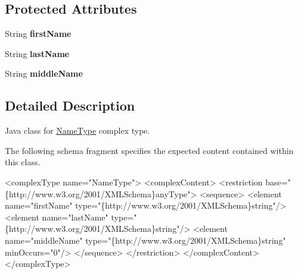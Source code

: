 \subsection*{Protected Attributes}
\begin{DoxyCompactItemize}
\item 
\hypertarget{classcom_1_1telefonica_1_1schemas_1_1unica_1_1rest_1_1directory_1_1v1_1_1NameType_afd5e3e0b03a0ed6c6f1b8b42b3fbea0e}{
String {\bfseries firstName}}
\label{classcom_1_1telefonica_1_1schemas_1_1unica_1_1rest_1_1directory_1_1v1_1_1NameType_afd5e3e0b03a0ed6c6f1b8b42b3fbea0e}

\item 
\hypertarget{classcom_1_1telefonica_1_1schemas_1_1unica_1_1rest_1_1directory_1_1v1_1_1NameType_ad0612c47f322b339ca6ac0a0cedd188e}{
String {\bfseries lastName}}
\label{classcom_1_1telefonica_1_1schemas_1_1unica_1_1rest_1_1directory_1_1v1_1_1NameType_ad0612c47f322b339ca6ac0a0cedd188e}

\item 
\hypertarget{classcom_1_1telefonica_1_1schemas_1_1unica_1_1rest_1_1directory_1_1v1_1_1NameType_adfcca6ac63ae4326a3a844a6cc0724d8}{
String {\bfseries middleName}}
\label{classcom_1_1telefonica_1_1schemas_1_1unica_1_1rest_1_1directory_1_1v1_1_1NameType_adfcca6ac63ae4326a3a844a6cc0724d8}

\end{DoxyCompactItemize}


\subsection{Detailed Description}
Java class for \hyperlink{classcom_1_1telefonica_1_1schemas_1_1unica_1_1rest_1_1directory_1_1v1_1_1NameType}{NameType} complex type.

The following schema fragment specifies the expected content contained within this class.


\begin{DoxyPre}
 <complexType name="NameType">
   <complexContent>
     <restriction base="\{http://www.w3.org/2001/XMLSchema\}anyType">
       <sequence>
         <element name="firstName" type="\{http://www.w3.org/2001/XMLSchema\}string"/>
         <element name="lastName" type="\{http://www.w3.org/2001/XMLSchema\}string"/>
         <element name="middleName" type="\{http://www.w3.org/2001/XMLSchema\}string" minOccurs="0"/>
       </sequence>
     </restriction>
   </complexContent>
 </complexType>
 \end{DoxyPre}
 

